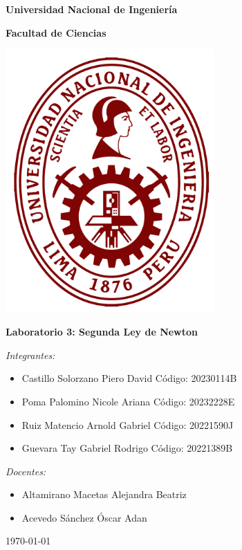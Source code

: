 \documentclass[../main.tex]{subfiles}
\begin{document}
\onecolumn

\begin{center}
\textbf{\fontsize{14}{\baselineskip}\selectfont Universidad Nacional de Ingeniería}

\bigskip

\textbf{\fontsize{14}{\baselineskip}\selectfont Facultad de Ciencias}

\bigskip

\includegraphics[width=8cm]{images/uni_logo.png}

\bigskip

\textbf{\fontsize{20}{\baselineskip}\selectfont Laboratorio 3: Segunda Ley de Newton}

\bigskip

\textit{\fontsize{14}{\baselineskip}\selectfont Integrantes:}

\begin{itemize}{}
    \item \fontsize{14}{\baselineskip}\selectfont Castillo Solorzano Piero David Código: 20230114B
    \item \fontsize{14}{\baselineskip}\selectfont Poma Palomino Nicole Ariana   Código: 20232228E
    \item \fontsize{14}{\baselineskip}\selectfont Ruiz Matencio Arnold Gabriel   Código: 20221590J
    \item \fontsize{14}{\baselineskip}\selectfont Guevara Tay Gabriel Rodrigo   Código: 20221389B
\end{itemize}

\textit{\fontsize{14}{\baselineskip}\selectfont Docentes:}

\begin{itemize}
    \item \fontsize{14}{\baselineskip}\selectfont Altamirano Macetas Alejandra Beatriz
    \item \fontsize{14}{\baselineskip}\selectfont Acevedo Sánchez Óscar Adan
\end{itemize}

\bigskip

{\today}
\end{center}

\clearpage
\end{document}
